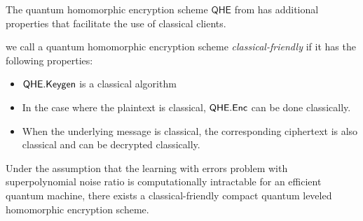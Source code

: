 The quantum homomorphic encryption scheme $\mathsf{QHE}$ from \cite{mahadev_qfhe} has additional properties that facilitate the use of classical clients.

\begin{definition}
	we call a quantum homomorphic encryption scheme \emph{classical-friendly} if it has the following properties:
	\begin{itemize}
		\item $\mathsf{QHE.Keygen}$ is a classical algorithm
		\item In the case where the plaintext is classical, $\mathsf{QHE.Enc}$ can be done classically.
		\item When the underlying message is classical, the corresponding ciphertext is also classical and can be decrypted classically.
	\end{itemize}
\end{definition}

\begin{theorem} 
	Under the assumption that the learning with errors problem with superpolynomial noise ratio is computationally intractable for an efficient quantum machine,
	there exists a classical-friendly compact quantum leveled homomorphic encryption scheme.
\end{theorem}
